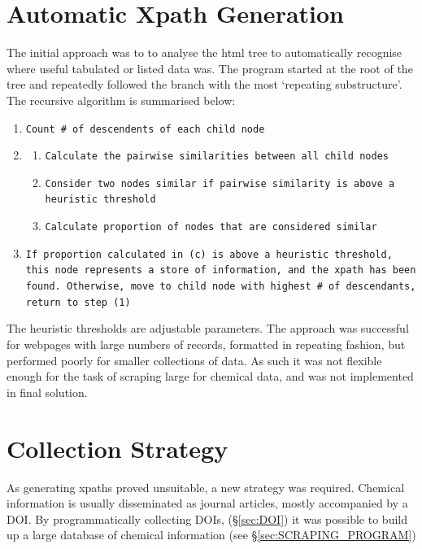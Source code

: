 \section{Automatic Xpath Generation}
The initial approach was to to analyse the html tree to automatically recognise where useful tabulated or listed data was. The program started at the root of the tree and repeatedly followed the branch with the most `repeating substructure'. The recursive algorithm is summarised below:
\begin{sloppypar}
\begin{enumerate}
\item \texttt{Count \# of descendents of each child node}
\item \begin{enumerate}
\item \texttt{Calculate the pairwise similarities between all child nodes}
\item \texttt{Consider  two nodes similar if pairwise similarity is above a heuristic threshold}
\item \texttt{Calculate proportion of nodes that are considered similar}
\end{enumerate}
\item \texttt{If proportion calculated in (c) is above a heuristic threshold, this node represents a store of information, and the xpath has been found. Otherwise, move to child node with highest \# of descendants, return to step (1)}
\end{enumerate}
\end{sloppypar}
The heuristic thresholds are adjustable parameters. The approach was successful for webpages with large numbers of records, formatted in repeating fashion, but performed poorly for smaller collections of data. As such it was not flexible enough for the task of scraping large for chemical data, and was not implemented in final solution.
\section{Collection Strategy}
As generating xpaths proved unsuitable, a new strategy was required. Chemical information is usually disseminated as journal articles, mostly accompanied by a DOI. By programmatically collecting DOIs, (\S\ref{sec:DOI}) it was possible to build up a large database of chemical information (see  \S\ref{sec:SCRAPING_PROGRAM})
